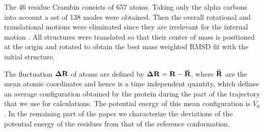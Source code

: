\documentclass[prl,nofootinbib,twocolumn,floatfix,showpacs]{revtex4}
\begin{document}
The 46 residue Crambin consists of 657 atoms. Taking only the alpha
carbons into account a set of 138 modes were obtained. Then the
overall rotational and translational motions were eliminated since
they are irrelevant for the internal motion \cite{Moritsugu2003}. All
structures were translated so that their center of mass is positioned
at the origin and rotated to obtain the best mass weighted RMSD fit
with the initial structure.

The fluctuation ${\bf \Delta R}$ of atoms are defined by ${\bf \Delta
R} = {\bf {R}-\bar{R}}$, where ${\bf \bar{R}}$ are the mean atomic
coordinates and hence is a time independent quantity, which defines an
average configuration obtained by the protein during the part of the
trajectory that we use for calculations. The potential energy of this
mean configuration is $V_0$. In the remaining part of the paper we
characterize the deviations of the potential energy of the residues
from that of the reference conformation.
\end{document}
